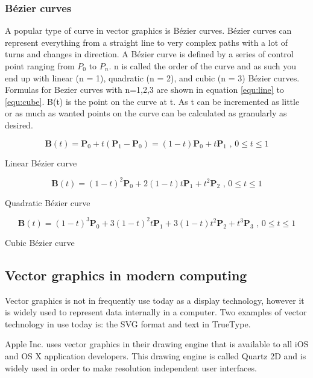 \subsubsection{Bézier curves}
\label{sec:bezier}
A popular type of curve in vector graphics is Bézier curves.
Bézier curves can represent everything from a straight line to very complex paths with a lot of turns and changes in direction.
A Bézier curve is defined by a series of control point ranging from \(P_0\) to \(P_n\).
n is called the order of the curve and as such you end up with linear (n = 1), quadratic (n = 2), and cubic (n = 3) Bézier curves.
Formulas for Bezier curves with n=1,2,3 are shown in equation \ref{equ:line} to \ref{equ:cube}.
B(t) is the point on the curve at t.
As t can be incremented as little or as much as wanted points on the curve can be calculated as granularly as desired.

\begin{cequation}[H]
	\begin{equation}
	    \label{equ:line}
		\mathbf{B}(t)=\mathbf{P}_0 + t(\mathbf{P}_1-\mathbf{P}_0)=(1-t)\mathbf{P}_0 + t\mathbf{P}_1 \mbox{ , } 0 \le t \le 1
	\end{equation}
	\caption{Linear Bézier curve}
\end{cequation}

\begin{cequation}[H]
	\begin{equation}
		\mathbf{B}(t) = (1 - t)^{2}\mathbf{P}_0 + 2(1 - t)t\mathbf{P}_1 + t^{2}\mathbf{P}_2 \mbox{ , } 0 \le t \le 1
	\end{equation}
	\caption{Quadratic Bézier curve}
\end{cequation}

\begin{cequation}[H]
	\begin{equation}
	    \label{equ:cube}
		\mathbf{B}(t)=(1-t)^3\mathbf{P}_0+3(1-t)^2t\mathbf{P}_1+3(1-t)t^2\mathbf{P}_2+t^3\mathbf{P}_3 \mbox{ , } 0 \le t \le 1
	\end{equation}
	\caption{Cubic Bézier curve}
\end{cequation}

\subsection{Vector graphics in modern computing}

Vector graphics is not in frequently use today as a display technology, however it is widely used to represent data internally in a computer.
Two examples of vector technology in use today is: the SVG format and text in TrueType\cite{truetype}.

Apple Inc.\cite{apple} uses vector graphics in their drawing engine that is available to all iOS and OS X application developers.
This drawing engine is called Quartz 2D\cite{quartz2d} and is widely used in order to make resolution independent user interfaces.
